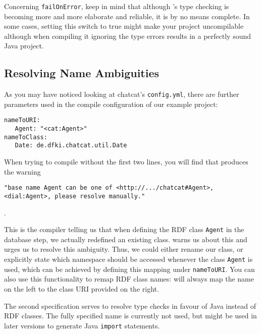Concerning \texttt{failOnError}, keep in mind that although \vonda's type
checking is becoming more and more elaborate and reliable, it is by no means
complete. In some cases, setting this switch to true might make your project
uncompilable although when compiling it ignoring the type errors results in a
perfectly sound Java project.

\subsection{Resolving Name Ambiguities} \label{sec:nsAmbigue}

As you may have noticed looking at chatcat's \texttt{config.yml}, there are
further parameters used in the compile configuration of our example project:

\begin{lstlisting}[style=yaml]
nameToURI:
   Agent: "<cat:Agent>"
nameToClass:
   Date: de.dfki.chatcat.util.Date
\end{lstlisting}

When trying to compile without the first two lines, you will find that \vonda
produces the warning \ \begin{small}\texttt{"base name Agent can be one of
<http://.../chatcat\#Agent>, <dial:Agent>, please resolve manually."}\end{small}.

This is the compiler telling us that when defining the RDF class \texttt{Agent}
in the database step, we actually redefined an existing class. \vonda warns us
about this and urges us to resolve this ambiguity. Thus, we could either rename
our class, or explicitly state which namespace should be accessed whenever the
class \texttt{Agent} is used, which can be achieved by defining this mapping
under \texttt{nameToURI}. You can also use this functionality to remap RDF
class names: \vonda will always map the name on the left to the class URI
provided on the right.

The second specification serves to resolve type checks in favour of Java
instead of RDF classes. The fully specified name is currently not used, but
might be used in later versions to generate Java \texttt{import} statements.



